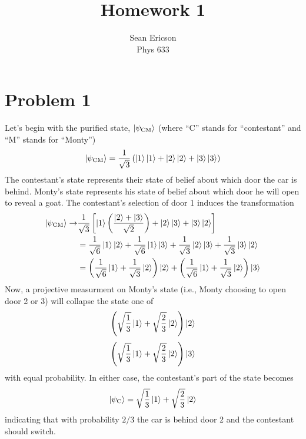 \documentclass[12pt]{article}
\begin{document}
	
\title{Homework 1}
\author{Sean Ericson \\ Phys 633}
\maketitle

\section*{Problem 1}
Let's begin with the purified state, $\ket{\psi_\text{CM}}$ (where ``C'' stands for ``contestant'' and ``M'' stands for ``Monty'')
\[ \ket{\psi_\text{CM}} = \frac{1}{\sqrt{3}}\left(\ket{1}\ket{1} + \ket{2}\ket{2} + \ket{3}\ket{3}\right)\]
The contestant's state represents their state of belief about which door the car is behind. Monty's state represents his state of belief about which door he will open to reveal a goat. The contestant's selection of door 1 induces the transformation
\begin{align*}
     \ket{\psi_\text{CM}} \to& \frac{1}{\sqrt{3}}\left[\ket{1}\left(\frac{\ket{2}+\ket{3}}{\sqrt{2}}\right) + \ket{2}\ket{3} + \ket{3}\ket{2}\right] \\
     &= \frac{1}{\sqrt{6}}\ket{1}\ket{2} + \frac{1}{\sqrt{6}}\ket{1}\ket{3} + \frac{1}{\sqrt{3}}\ket{2}\ket{3} + \frac{1}{\sqrt{3}}\ket{3}\ket{2} \\
     &= \left(\frac{1}{\sqrt{6}}\ket{1} + \frac{1}{\sqrt{3}}\ket{2}\right)\ket{2} + \left(\frac{1}{\sqrt{6}}\ket{1} + \frac{1}{\sqrt{3}}\ket{2}\right)\ket{3}
\end{align*}
Now, a projective measurment on Monty's state (i.e., Monty choosing to open door 2 or 3) will collapse the state one of
\[ \left(\sqrt{\frac{1}{3}}\ket{1} + \sqrt{\frac{2}{3}}\ket{2}\right)\ket{2} \]
\[ \left(\sqrt{\frac{1}{3}}\ket{1} + \sqrt{\frac{2}{3}}\ket{2}\right)\ket{3} \]
with equal probability. In either case, the contestant's part of the state becomes
\[ \ket{\psi_\text{C}} = \sqrt{\frac{1}{3}}\ket{1} + \sqrt{\frac{2}{3}}\ket{2}\]
indicating that with probability $2/3$ the car is behind door 2 and the contestant should switch.
\end{document}
